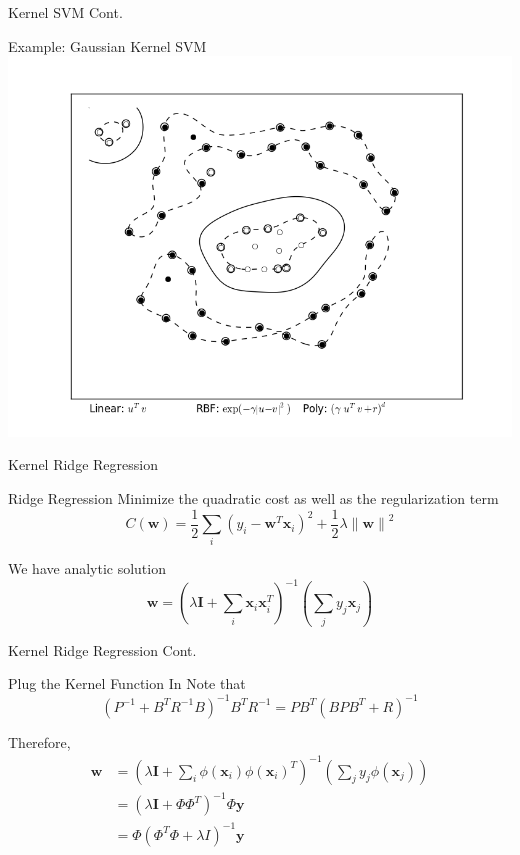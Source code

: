 \documentclass[10pt, compress]{beamer}
\begin{document}
\begin{frame}[fragile]{Kernel SVM Cont.}
  \begin{block}{Example: Gaussian Kernel SVM}
    \includegraphics[width=\textwidth, height=.7\textheight]{images/non_linear.png}
  \end{block}
\end{frame}


\begin{frame}[fragile]{Kernel Ridge Regression}
  \begin{block}{Ridge Regression}
    Minimize the quadratic cost as well as the regularization term
    \[
      C(\mathbf{w}) = \frac{1}{2} \sum_{i} {(y_i - \mathbf{w}^T\mathbf{x}_i)}^2 + \frac{1}{2} \lambda {\| \mathbf{w} \|}^2
    \]

    We have analytic solution
    \[
      \mathbf{w} = {(\lambda \mathbf{I} + \sum_{i} \mathbf{x}_i \mathbf{x}_i^T )}^{-1} (\sum_{j} y_j \mathbf{x}_j)
    \]
  \end{block}
\end{frame}

\begin{frame}[fragile]{Kernel Ridge Regression Cont.}
  \begin{block}{Plug the Kernel Function In}
    Note that
    \[
      {(P^{-1} + B^T R^{-1} B)}^{-1} B^T R^{-1} = PB^T {(BPB^T + R)}^{-1}
    \]

    Therefore,
    \begin{align*}
      \mathbf{w} &= {(\lambda \mathbf{I} + \sum_{i} \phi(\mathbf{x}_i) {\phi(\mathbf{x}_i)}^T )}^{-1} (\sum_{j} y_j \phi(\mathbf{x}_j)) \\
                &= {(\lambda \mathbf{I} + \Phi \Phi^T) }^{-1} \Phi \mathbf{y} \\
                &= \Phi {(\Phi^T \Phi + \lambda I)}^{-1} \mathbf{y}
    \end{align*}
  \end{block}
\end{frame}
\end{document}
